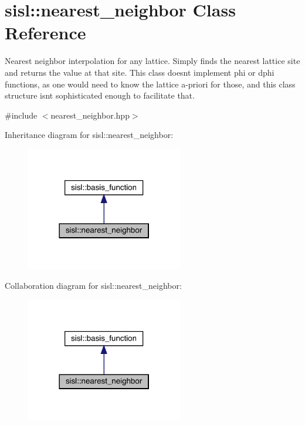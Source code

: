 \hypertarget{classsisl_1_1nearest__neighbor}{}\section{sisl\+:\+:nearest\+\_\+neighbor Class Reference}
\label{classsisl_1_1nearest__neighbor}


Nearest neighbor interpolation for any lattice. Simply finds the nearest lattice site and returns the value at that site. This class doesn\textquotesingle{}t implement phi or dphi functions, as one would need to know the lattice a-\/priori for those, and this class structure isn\textquotesingle{}t sophisticated enough to facilitate that.  




{\ttfamily \#include $<$nearest\+\_\+neighbor.\+hpp$>$}



Inheritance diagram for sisl\+:\+:nearest\+\_\+neighbor\+:\nopagebreak
\begin{figure}[H]
\begin{center}
\leavevmode
\includegraphics[width=194pt]{classsisl_1_1nearest__neighbor__inherit__graph}
\end{center}
\end{figure}


Collaboration diagram for sisl\+:\+:nearest\+\_\+neighbor\+:\nopagebreak
\begin{figure}[H]
\begin{center}
\leavevmode
\includegraphics[width=194pt]{classsisl_1_1nearest__neighbor__coll__graph}
\end{center}
\end{figure}
